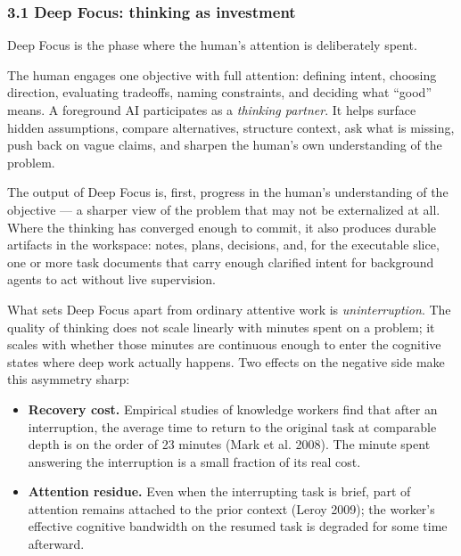 \documentclass[
  nonatbib,
  preprint]{article}
\providecommand{\tightlist}{%
  \setlength{\itemsep}{0pt}\setlength{\parskip}{0pt}}
\begin{document}
\subsubsection{\texorpdfstring{\textbf{3.1 Deep Focus: thinking as
investment}}{3.1 Deep Focus: thinking as investment}}\label{deep-focus-thinking-as-investment}

Deep Focus is the phase where the human's attention is deliberately
spent.

The human engages one objective with full attention: defining intent,
choosing direction, evaluating tradeoffs, naming constraints, and
deciding what ``good'' means. A foreground AI participates as a
\emph{thinking partner}. It helps surface hidden assumptions, compare
alternatives, structure context, ask what is missing, push back on vague
claims, and sharpen the human's own understanding of the problem.

The output of Deep Focus is, first, progress in the human's
understanding of the objective --- a sharper view of the problem that
may not be externalized at all. Where the thinking has converged enough
to commit, it also produces durable artifacts in the workspace: notes,
plans, decisions, and, for the executable slice, one or more task
documents that carry enough clarified intent for background agents to
act without live supervision.

What sets Deep Focus apart from ordinary attentive work is
\emph{uninterruption}. The quality of thinking does not scale linearly
with minutes spent on a problem; it scales with whether those minutes
are continuous enough to enter the cognitive states where deep work
actually happens. Two effects on the negative side make this asymmetry
sharp:

\begin{itemize}
\tightlist
\item
  \textbf{Recovery cost.} Empirical studies of knowledge workers find
  that after an interruption, the average time to return to the original
  task at comparable depth is on the order of 23 minutes (Mark et al.
  2008). The minute spent answering the interruption is a small fraction
  of its real cost.
\item
  \textbf{Attention residue.} Even when the interrupting task is brief,
  part of attention remains attached to the prior context (Leroy 2009);
  the worker's effective cognitive bandwidth on the resumed task is
  degraded for some time afterward.
\end{itemize}
\end{document}
